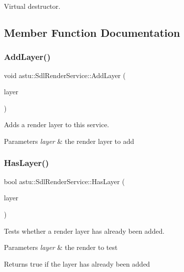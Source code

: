 Virtual destructor. 

\subsection{Member Function Documentation}
\mbox{\label{classastu_1_1SdlRenderService_af025dba6e6ada1f09badaa6de75292d1}} 
\subsubsection{\texorpdfstring{Add\+Layer()}{AddLayer()}}
{\footnotesize\ttfamily void astu\+::\+Sdl\+Render\+Service\+::\+Add\+Layer (\begin{DoxyParamCaption}\item[{std\+::shared\+\_\+ptr$<$ \hyperlink{classastu_1_1ISdlRenderLayer}{I\+Sdl\+Render\+Layer} $>$}]{layer }\end{DoxyParamCaption})}

Adds a render layer to this service.


\begin{DoxyParams}{Parameters}
{\em layer} & the render layer to add \\
\hline
\end{DoxyParams}
\mbox{\label{classastu_1_1SdlRenderService_a45016463f301b52b1ffacfa976eb9849}} 
\subsubsection{\texorpdfstring{Has\+Layer()}{HasLayer()}}
{\footnotesize\ttfamily bool astu\+::\+Sdl\+Render\+Service\+::\+Has\+Layer (\begin{DoxyParamCaption}\item[{std\+::shared\+\_\+ptr$<$ \hyperlink{classastu_1_1ISdlRenderLayer}{I\+Sdl\+Render\+Layer} $>$}]{layer }\end{DoxyParamCaption})}

Tests whether a render layer has already been added.


\begin{DoxyParams}{Parameters}
{\em layer} & the render to test \\
\hline
\end{DoxyParams}
\begin{DoxyReturn}{Returns}
{\ttfamily true} if the layer has already been added 
\end{DoxyReturn}
\mbox{\label{classastu_1_1SdlRenderService_a4f21478ca10de11d260792c3ccd79eef}} 
